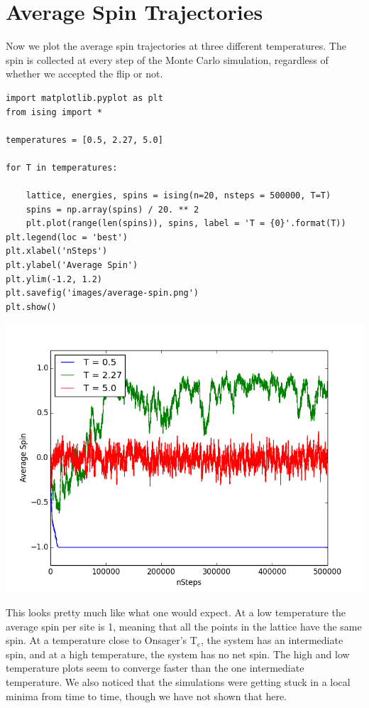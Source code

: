 \documentclass{article}
\begin{document}
\section{Average Spin Trajectories}
\label{sec-4}

Now we plot the average spin trajectories at three different temperatures. The spin is collected at every step of the Monte Carlo simulation, regardless of whether we accepted the flip or not.

\begin{verbatim}
import matplotlib.pyplot as plt
from ising import *

temperatures = [0.5, 2.27, 5.0]

for T in temperatures:

    lattice, energies, spins = ising(n=20, nsteps = 500000, T=T)
    spins = np.array(spins) / 20. ** 2
    plt.plot(range(len(spins)), spins, label = 'T = {0}'.format(T))
plt.legend(loc = 'best')
plt.xlabel('nSteps')
plt.ylabel('Average Spin')
plt.ylim(-1.2, 1.2)
plt.savefig('images/average-spin.png')
plt.show()
\end{verbatim}

\includegraphics[width=.9\linewidth]{./images/average-spin.png}

This looks pretty much like what one would expect. At a low temperature the average spin per site is 1, meaning that all the points in the lattice have the same spin. At a temperature close to Onsager's T$_{\text{c}}$, the system has an intermediate spin, and at a high temperature, the system has no net spin. The high and low temperature plots seem to converge faster than the one intermediate temperature. We also noticed that the simulations were getting stuck in a local minima from time to time, though we have not shown that here.
\end{document}
